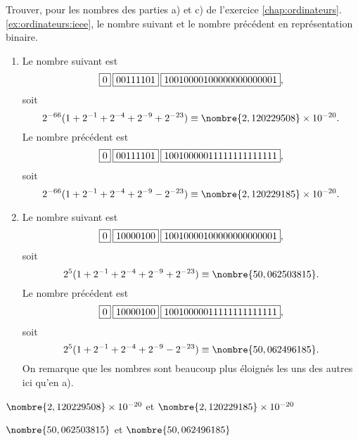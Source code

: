 \begin{exercice}
  Trouver, pour les nombres des parties a) et c) de l'exercice
  \ref{chap:ordinateurs}.\ref{ex:ordinateurs:ieee}, le nombre suivant
  et le nombre précédent en représentation binaire.
  \begin{sol}
    \begin{enumerate}
    \item Le nombre suivant est
      \begin{displaymath}
        \fbox{$0$}\hspace{2pt}\fbox{$00111101$}\hspace{2pt}\fbox{$10010000100000000000001$},
      \end{displaymath}
      soit
      \begin{displaymath}
        2^{-66} (1 + 2^{-1} + 2^{-4} + 2^{-9} + 2^{-23}) \\
        \equiv \nombre{2,120229508} \times 10^{-20}.
      \end{displaymath}
      Le nombre précédent est
      \begin{displaymath}
        \fbox{$0$}\hspace{2pt}\fbox{$00111101$}\hspace{2pt}\fbox{$10010000011111111111111$},
      \end{displaymath}
      soit
      \begin{displaymath}
        2^{-66} (1 + 2^{-1} + 2^{-4} + 2^{-9} - 2^{-23}) \\
        \equiv \nombre{2,120229185} \times 10^{-20}.
      \end{displaymath}
    \item Le nombre suivant est
      \begin{displaymath}
        \fbox{$0$}\hspace{2pt}\fbox{$10000100$}\hspace{2pt}\fbox{$10010000100000000000001$},
      \end{displaymath}
      soit
      \begin{displaymath}
        2^5 (1 + 2^{-1} + 2^{-4} + 2^{-9} + 2^{-23}) \\
        \equiv \nombre{50,062503815}.
      \end{displaymath}
      Le nombre précédent est
      \begin{displaymath}
        \fbox{$0$}\hspace{2pt}\fbox{$10000100$}\hspace{2pt}\fbox{$10010000011111111111111$},
      \end{displaymath}
      soit
      \begin{displaymath}
        2^5 (1 + 2^{-1} + 2^{-4} + 2^{-9} - 2^{-23}) \\
        \equiv \nombre{50,062496185}.
      \end{displaymath}
      On remarque que les nombres sont beaucoup plus éloignés les uns
      des autres ici qu'en a).
    \end{enumerate}
  \end{sol}
  \begin{rep}
    \begin{inparaenum}
    \item $\nombre{2,120229508} \times 10^{-20}$ et
      $\nombre{2,120229185} \times 10^{-20}$
    \item $\nombre{50,062503815}$ et $\nombre{50,062496185}$
    \end{inparaenum}
  \end{rep}
\end{exercice}





